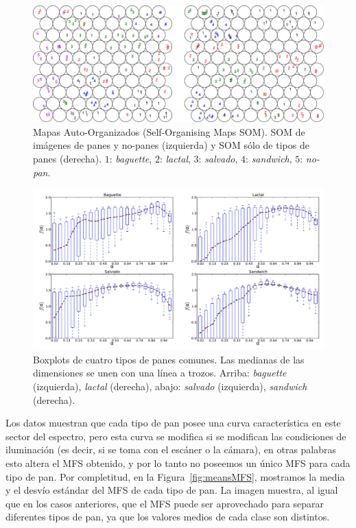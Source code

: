\begin{figure}[h!]
\begin{centering}
\includegraphics[width=12cm]{figures/SOM}
\caption[Mapas Auto-Organizados de imágenes de panes y otros objetos]{Mapas Auto-Organizados (Self-Organising Maps SOM). SOM de imágenes de panes y no-panes (izquierda) y SOM sólo de tipos de panes (derecha). $1$: {\em baguette}, $2$: {\em lactal}, $3$: {\em salvado}, $4$: {\em sandwich}, $5$: {\em no-pan}.}
\label{fig:somfractal}
\end{centering}
\end{figure}

\begin{figure}[h!]
\centering
\includegraphics[width=12cm]{figures/boxplots}
\caption[Boxplots de distintos tipos de panes]{Boxplots de cuatro tipos de panes comunes. Las medianas de las dimensiones se unen con una línea a trozos. Arriba: {\em baguette} (izquierda), {\em lactal} (derecha), abajo: {\em salvado} (izquierda), {\em sandwich} (derecha).}
\label{fig:boxplotsMFS}
\end{figure}


Los datos muestran que cada tipo de pan posee una curva característica en este sector del espectro, pero esta curva se modifica si se modifican las condiciones de iluminación (es decir, si se toma con el escáner o la cámara), en otras palabras esto altera el MFS obtenido, y por lo tanto no poseemos un único MFS para cada tipo de pan. 
Por completitud, en la Figura~\ref{fig:meansMFS}, mostramos la media y el desvío estándar del MFS de cada tipo de pan.
La imagen muestra, al igual que en los casos anteriores, que el MFS puede ser aprovechado para separar diferentes tipos de pan, ya que los valores medios de cada clase son distintos.


